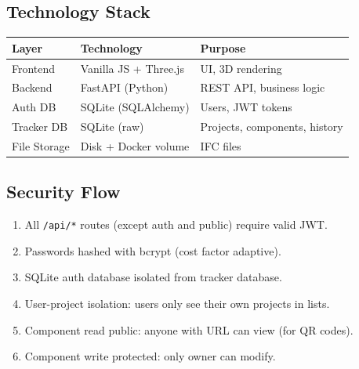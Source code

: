 \documentclass[11pt,a4paper]{article}
\begin{document}
\subsection{Technology Stack}

\begin{center}
\begin{tabular}{|l|l|l|}
\hline
\textbf{Layer} & \textbf{Technology} & \textbf{Purpose} \\
\hline
Frontend & Vanilla JS + Three.js & UI, 3D rendering \\
Backend & FastAPI (Python) & REST API, business logic \\
Auth DB & SQLite (SQLAlchemy) & Users, JWT tokens \\
Tracker DB & SQLite (raw) & Projects, components, history \\
File Storage & Disk + Docker volume & IFC files \\
\hline
\end{tabular}
\end{center}

\subsection{Security Flow}

\begin{enumerate}
    \item All \texttt{/api/*} routes (except auth and public) require valid JWT.
    \item Passwords hashed with bcrypt (cost factor adaptive).
    \item SQLite auth database isolated from tracker database.
    \item User-project isolation: users only see their own projects in lists.
    \item Component read public: anyone with URL can view (for QR codes).
    \item Component write protected: only owner can modify.
\end{enumerate}
\end{document}

